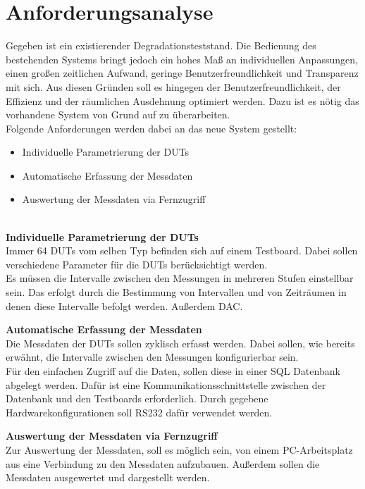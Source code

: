 
\chapter{Anforderungsanalyse}
\label{chapter_Anforderungsanalyse}
Gegeben ist ein existierender Degradationsteststand. Die Bedienung des bestehenden Systems bringt jedoch ein hohes Maß an individuellen Anpassungen, einen großen zeitlichen Aufwand, geringe Benutzerfreundlichkeit und Transparenz mit sich. Aus diesen Gründen soll es hingegen der Benutzerfreundlichkeit, der Effizienz und der räumlichen Ausdehnung optimiert werden. Dazu ist es nötig das vorhandene System von Grund auf zu überarbeiten.\\

Folgende Anforderungen werden dabei an das neue System gestellt:
\begin{itemize}
\item Individuelle Parametrierung der \acp{DUT}
\item Automatische Erfassung der Messdaten
\item Auswertung der Messdaten via Fernzugriff
\end{itemize}
\ \\
\textbf{Individuelle Parametrierung der \acp{DUT}}\\
Immer 64 \acp{DUT} vom selben Typ befinden sich auf einem Testboard. Dabei sollen verschiedene Parameter für die \acp{DUT} berücksichtigt werden. \\
Es müssen die Intervalle zwischen den Messungen in mehreren Stufen einstellbar sein. Das erfolgt durch die Bestimmung von Intervallen und von Zeiträumen in denen diese Intervalle befolgt werden. Außerdem DAC.



\textbf{Automatische Erfassung der Messdaten}\\
Die Messdaten der \acp{DUT} sollen zyklisch erfasst werden. Dabei sollen, wie bereits erwähnt, die Intervalle zwischen den Messungen konfigurierbar sein.\\
Für den einfachen Zugriff auf die Daten, sollen diese in einer \ac{SQL} Datenbank abgelegt werden. Dafür ist eine Kommunikationsschnittstelle zwischen der Datenbank und den Testboards erforderlich. Durch gegebene Hardwarekonfigurationen soll RS232 dafür verwendet werden.

\textbf{Auswertung der Messdaten via Fernzugriff}\\
Zur Auswertung der Messdaten, soll es möglich sein, von einem PC-Arbeitsplatz aus eine Verbindung zu den Messdaten aufzubauen. Außerdem sollen die Messdaten ausgewertet und dargestellt werden.